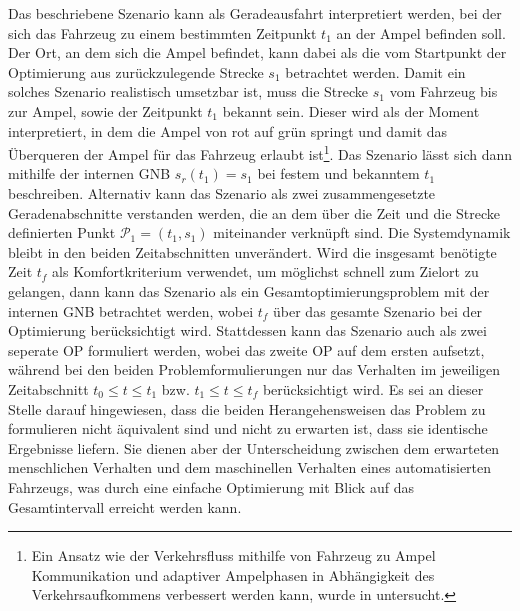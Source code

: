 Das beschriebene Szenario kann als Geradeausfahrt interpretiert werden, bei der sich das Fahrzeug zu einem bestimmten Zeitpunkt $t_1$ an der Ampel befinden soll. Der Ort, an dem sich die Ampel befindet, kann dabei als die vom Startpunkt der Optimierung aus zurückzulegende Strecke $s_1$ betrachtet werden. Damit ein solches Szenario realistisch umsetzbar ist, muss die Strecke $s_1$ vom Fahrzeug bis zur Ampel, sowie der Zeitpunkt $t_1$ bekannt sein. Dieser wird als der Moment interpretiert, in dem die Ampel von rot auf grün springt und damit das Überqueren der Ampel für das Fahrzeug erlaubt ist\footnote{Ein Ansatz wie der Verkehrsfluss mithilfe von Fahrzeug zu Ampel Kommunikation und adaptiver Ampelphasen in Abhängigkeit des Verkehrsaufkommens verbessert werden kann, wurde in \cite{Gradinescu} untersucht.}. Das Szenario lässt sich dann mithilfe der internen \gls{GNB} $s_r(t_1) = s_1$ bei festem und bekanntem $t_1$ beschreiben. Alternativ kann das Szenario als zwei zusammengesetzte Geradenabschnitte verstanden werden, die an dem über die Zeit und die Strecke definierten Punkt $\mathcal{P}_1 = (t_1, s_1)$ miteinander verknüpft sind. Die Systemdynamik bleibt in den beiden Zeitabschnitten unverändert. Wird die insgesamt benötigte Zeit $t_f$ als Komfortkriterium verwendet, um möglichst schnell zum Zielort zu gelangen, dann kann das Szenario als ein Gesamtoptimierungsproblem mit der internen \gls{GNB} betrachtet werden, wobei $t_f$ über das gesamte Szenario bei der Optimierung berücksichtigt wird. Stattdessen kann das Szenario auch als zwei seperate \gls{OP} formuliert werden, wobei das zweite \gls{OP} auf dem ersten aufsetzt, während bei den beiden Problemformulierungen nur das Verhalten im jeweiligen Zeitabschnitt $t_0 \leq t \leq t_1$ bzw. $t_1 \leq t \leq t_f$ berücksichtigt wird. Es sei an dieser Stelle darauf hingewiesen, dass die beiden Herangehensweisen das Problem zu formulieren nicht äquivalent sind und nicht zu erwarten ist, dass sie identische Ergebnisse liefern. Sie dienen aber der Unterscheidung zwischen dem erwarteten menschlichen Verhalten und dem maschinellen Verhalten eines automatisierten Fahrzeugs, was durch eine einfache Optimierung mit Blick auf das Gesamtintervall erreicht werden kann.

